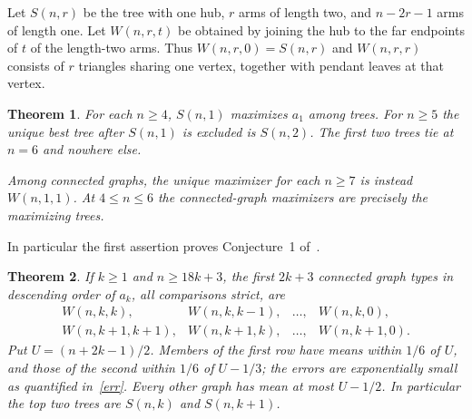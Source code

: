 \documentclass[11pt,a4paper]{article}
\newtheorem{thm}{Theorem}
\newcommand{\av}{a}
\begin{document}
Let $S(n,r)$ be the tree with one hub, $r$ arms of length two, and $n-2r-1$ arms of length one. Let $W(n,r,t)$ be obtained by joining the hub to the far endpoints of $t$ of the length-two arms. Thus $W(n,r,0)=S(n,r)$ and $W(n,r,r)$ consists of $r$ triangles sharing one vertex, together with pendant leaves at that vertex.
\begin{thm}\label{one}
For each $n\ge4$, $S(n,1)$ maximizes $\av_1$ among trees. For $n\ge5$ the unique best tree after $S(n,1)$ is excluded is $S(n,2)$. The first two trees tie at $n=6$ and nowhere else.

Among connected graphs, the unique maximizer for each $n\ge7$ is instead $W(n,1,1)$. At $4\le n\le6$ the connected-graph maximizers are precisely the maximizing trees.
\end{thm}
In particular the first assertion proves Conjecture~1 of~\cite{DA}.
\begin{thm}\label{main}
If $k\ge1$ and $n\ge18k+3$, the first $2k+3$ connected graph types in descending order of $\av_k$, all comparisons strict, are
\[
\begin{array}{llll}
W(n,k,k),& W(n,k,k-1),&\ldots,& W(n,k,0),\\
W(n,k+1,k+1),&W(n,k+1,k),&\ldots,&W(n,k+1,0).
\end{array}
\]
Put $U=(n+2k-1)/2$. Members of the first row have means within $1/6$ of $U$, and those of the second within $1/6$ of $U-1/3$; the errors are exponentially small as quantified in~\eqref{err}. Every other graph has mean at most $U-1/2$. In particular the top two trees are $S(n,k)$ and $S(n,k+1)$.
\end{thm}
\end{document}
